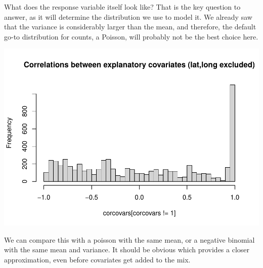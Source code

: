 \documentclass[
]{book}
\newenvironment{Shaded}{\begin{snugshade}}{\end{snugshade}}
\newcommand{\AttributeTok}[1]{\textcolor[rgb]{0.13,0.29,0.53}{#1}}
\newcommand{\DecValTok}[1]{\textcolor[rgb]{0.00,0.00,0.81}{#1}}
\newcommand{\FunctionTok}[1]{\textcolor[rgb]{0.13,0.29,0.53}{\textbf{#1}}}
\newcommand{\NormalTok}[1]{#1}
\newcommand{\SpecialCharTok}[1]{\textcolor[rgb]{0.81,0.36,0.00}{\textbf{#1}}}
\newcommand{\StringTok}[1]{\textcolor[rgb]{0.31,0.60,0.02}{#1}}
\begin{document}
What does the response variable itself look like? That is the key question to answer, as it will determine the distribution we use to model it. We already saw that the variance is considerably larger than the mean, and therefore, the default go-to distribution for counts, a Poisson, will probably not be the best choice here.

\begin{Shaded}
\end{Shaded}

\includegraphics{ECOMODbook_files/figure-latex/unnamed-chunk-71-1.pdf}

We can compare this with a poisson with the same mean, or a negative binomial with the same mean and variance. It should be obvious which provides a closer approximation, even before covariates get added to the mix.
\end{document}
